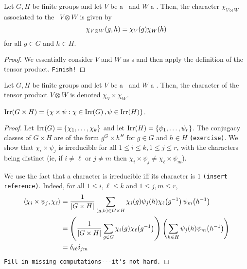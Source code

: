 \begin{proposition}
    Let $G, H$ be finite groups and let $V$ be a \CGM\ and $W$ a \CHM. Then, the character $\chi_{V \otimes W}$ associated to the \CGHM\ $V \otimes W$ is given by
    \begin{align*}
        \chi_{V \otimes W}\!\left( g, h \right) = \chi_V(g) \chi_W(h)
    \end{align*}
    for all $g \in G$ and $h \in H$.
\end{proposition}
\begin{proof}
    We essentially consider $V$ and $W$ as \CGHM s and then apply the definition of the tensor product. \verb|Finish!|
\end{proof}

\begin{boxnotation}
    Let $G, H$ be finite groups and let $V$ be a \CGM\ and $W$ a \CHM. Then, the character of the tensor product $V \otimes W$ is denoted $\chi_V \times \chi_W$.
\end{boxnotation}

\begin{boxtheorem}
    $\operatorname{Irr}\!\left( G \times H \right) = \left\{ \chi \times \psi : \chi \in \operatorname{Irr}\!\left( G \right), \psi \in \operatorname{Irr}\!\left( H \right) \right\}$.
\end{boxtheorem}
\begin{proof}
    Let $\operatorname{Irr}\!\left( G \right) = \left\{ \chi_1, \ldots, \chi_k \right\}$ and let $\operatorname{Irr}\!\left( H \right) = \left\{ \psi_1, \ldots, \psi_r \right\}$. The conjugacy classes of $G \times H$ are of the form $g^G \times h^H$ for $g \in G$ and $h \in H$ \verb|(exercise)|. We show that $\chi_i \times \psi_j$ is irreducible for all $1 \leq i \leq k, 1 \leq j \leq r$, with the characters being distinct (ie, if $i \neq \ell$ or $j \neq m$ then $\chi_i \times \psi_j \neq \chi_\ell \times \psi_m$).  %

    We use the fact that a character is irreducible iff its character is $1$ \verb|(insert reference)|. Indeed, for all $1 \leq i, \ell \leq k$ and $1 \leq j, m \leq r$,
    \begin{align*}
        \left\langle \chi_i \times \psi_j, \chi_\ell \right\rangle &= \frac{1}{\left\lvert G \times H \right\rvert} \sum_{(g, h) \in G \times H} \chi_i(g) \psi_j(h) \chi_\ell\!\left( g^{-1} \right)\psi_m\!\left( h^{-1} \right) \\
        &= \left( \frac{1}{\left\lvert G \times H \right\rvert} \sum_{g \in G} \chi_i(g) \chi_\ell\!\left( g^{-1} \right) \right) \left( \sum_{h \in H} \psi_j(h) \psi_m\!\left( h^{-1} \right) \right) \\
        &= \delta_{i\ell} \delta_{jm}
    \end{align*}
    \verb|Fill in missing computations---it's not hard.|
\end{proof}

